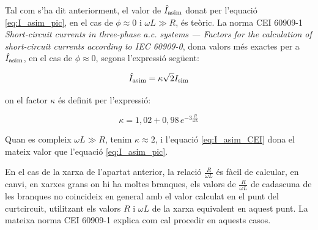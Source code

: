 Tal com s'ha dit anteriorment, el valor de $\hat{I}_\mathrm{asim}$ donat per l'equació \eqref{eq:I_asim_pic}, en el cas de $\phi \approx 0$ i $\omega L\gg R$, és teòric. La norma CEI 60909-1 \textit{Short-circuit currents in three-phase a.c. systems ---  Factors for the calculation of short-circuit currents according to IEC 60909-0}, dona valors més exactes per a $\hat{I}_\mathrm{asim}$, en el cas de $\phi \approx 0$, segons l'expressió següent:

\begin{equation}
    \hat{I}_\mathrm{asim} = \kappa \sqrt{2} I_\mathrm{sim} \label{eq:I_asim_CEI}
\end{equation}

on el factor $\kappa$ és definit per l'expressió:

\begin{equation}
    \kappa = 1{,}02 + 0{,}98 \,e^{-3\frac{R}{\omega L}}\label{eq:kappa_CEI}
\end{equation}

Quan es compleix $\omega L\gg R$, tenim $\kappa \approx 2$, i l'equació \eqref{eq:I_asim_CEI} dona el mateix valor que l'equació \eqref{eq:I_asim_pic}.

En el cas de la xarxa de l'apartat anterior, la relació $\frac{R}{\omega L}$ és fàcil de  calcular, en canvi, en xarxes grans on hi ha moltes branques, els valors de $\frac{R}{\omega L}$ de cadascuna de les branques no coincideix en general amb el valor calculat en el punt del curtcircuit, utilitzant els valors $R$ i $\omega L$ de la xarxa equivalent en aquest punt. La mateixa norma CEI 60909-1 explica com cal procedir en aquests casos.


